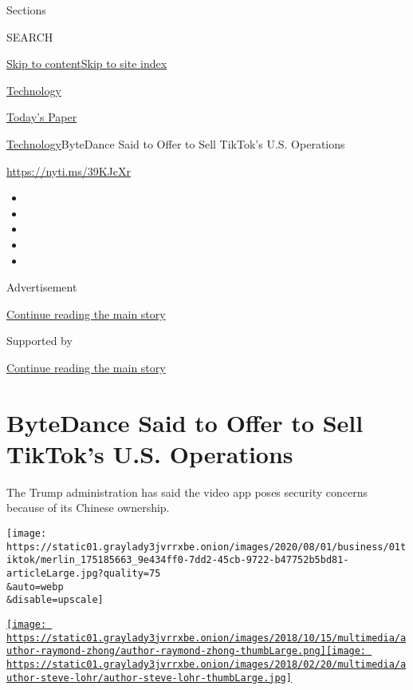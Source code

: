Sections

SEARCH

\protect\hyperlink{site-content}{Skip to
content}\protect\hyperlink{site-index}{Skip to site index}

\href{https://www.nytimes3xbfgragh.onion/section/technology}{Technology}

\href{https://myaccount.nytimes3xbfgragh.onion/auth/login?response_type=cookie\&client_id=vi}{}

\href{https://www.nytimes3xbfgragh.onion/section/todayspaper}{Today's
Paper}

\href{/section/technology}{Technology}\textbar{}ByteDance Said to Offer
to Sell TikTok's U.S. Operations

\href{https://nyti.ms/39KJcXr}{https://nyti.ms/39KJcXr}

\begin{itemize}
\item
\item
\item
\item
\item
\end{itemize}

Advertisement

\protect\hyperlink{after-top}{Continue reading the main story}

Supported by

\protect\hyperlink{after-sponsor}{Continue reading the main story}

\hypertarget{bytedance-said-to-offer-to-sell-tiktoks-us-operations}{%
\section{ByteDance Said to Offer to Sell TikTok's U.S.
Operations}\label{bytedance-said-to-offer-to-sell-tiktoks-us-operations}}

The Trump administration has said the video app poses security concerns
because of its Chinese ownership.

\texttt{[image: https://static01.graylady3jvrrxbe.onion/images/2020/08/01/business/01tiktok/merlin\_175185663\_9e434ff0-7dd2-45cb-9722-b47752b5bd81-articleLarge.jpg?quality=75\\\&auto=webp\\\&disable=upscale]}

\href{https://www.nytimes3xbfgragh.onion/by/raymond-zhong}{\texttt{[image: https://static01.graylady3jvrrxbe.onion/images/2018/10/15/multimedia/author-raymond-zhong/author-raymond-zhong-thumbLarge.png]}}\href{https://www.nytimes3xbfgragh.onion/by/steve-lohr}{\texttt{[image: https://static01.graylady3jvrrxbe.onion/images/2018/02/20/multimedia/author-steve-lohr/author-steve-lohr-thumbLarge.jpg]}}

